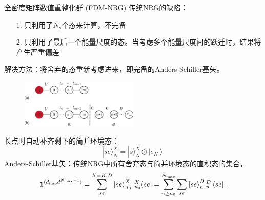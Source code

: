\documentclass[9pt,t]{beamer} %
\begin{document}
\begin{frame}{全密度矩阵数值重整化群 (FDM-NRG)}
传统NRG的缺陷：
\begin{itemize}
\setlength\itemsep{0.4em}
\item[1.] 只利用了$N_{s}$个态来计算，不完备
\item[2.] 只利用了最后一个能量尺度的态。当考虑多个能量尺度间的跃迁时，结果将产生严重偏差
\end{itemize}
解决方法：将舍弃的态重新考虑进来，即完备的Anders-Schiller基矢。
\begin{figure}
\includegraphics[width=0.5\textwidth]{chain-split.png}
\end{figure}
长点时自动补齐剩下的简并环境态：
\[
|s e\rangle_{N}^{X}=|s\rangle_{N}^{X} \otimes\left|e_{N}\right\rangle
\]
Anders-Schiller基矢：传统NRG中所有舍弃态与简并环境态的直积态的集合，
\begin{equation}\nonumber
\boldsymbol{1}^{(d_{\rm{imp}} d^{N_{\rm{max}}+1})} = \sum_{se}^{X=K,D} \ket{se}_{n_0}^X\hspace{0.8mm}{}_{n_0}^X \hspace{-0.8mm} \bra{se} = \sum_{n\geq n_0}^{N_{\rm{max}}} \sum_{se} \ket{se}_n^D {}_n^{\hspace{0.0mm} D} \bra{se}.
\end{equation}
\end{frame}
\end{document}
